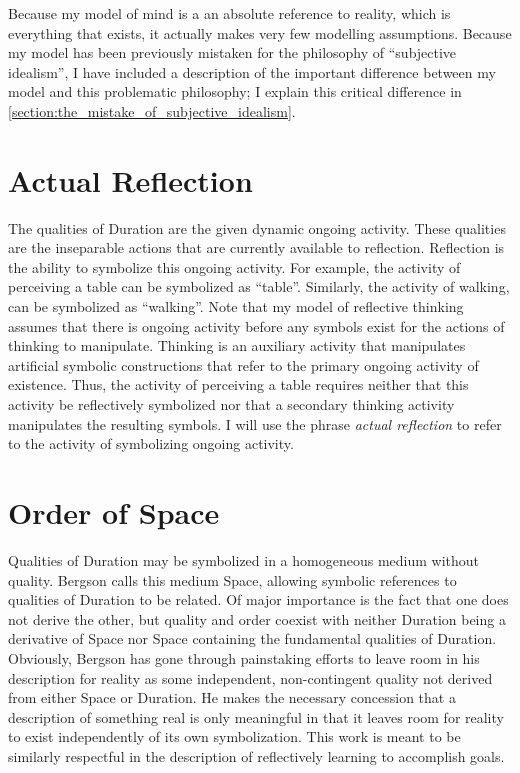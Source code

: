 Because my model of mind is a an absolute reference to reality, which
is everything that exists, it actually makes very few modelling
assumptions.  Because my model has been previously mistaken for the
philosophy of ``subjective idealism'', I have included a description
of the important difference between my model and this problematic
philosophy; I explain this critical difference in
\autoref{section:the_mistake_of_subjective_idealism}.

\section{Actual Reflection}

The qualities of Duration are the given dynamic ongoing activity.
These qualities are the inseparable actions that are currently
available to reflection.  Reflection is the ability to symbolize this
ongoing activity.  For example, the activity of perceiving a table can
be symbolized as ``table''.  Similarly, the activity of walking, can
be symbolized as ``walking''.  Note that my model of reflective
thinking assumes that there is ongoing activity before any symbols
exist for the actions of thinking to manipulate.  Thinking is an
auxiliary activity that manipulates artificial symbolic constructions
that refer to the primary ongoing activity of existence.  Thus, the
activity of perceiving a table requires neither that this activity be
reflectively symbolized nor that a secondary thinking activity
manipulates the resulting symbols.  I will use the phrase \emph{actual
  reflection} to refer to the activity of symbolizing ongoing
activity.

\section{Order of Space}

Qualities of Duration may be symbolized in a homogeneous medium
without quality.  Bergson calls this medium Space, allowing symbolic
references to qualities of Duration to be related.  Of major
importance is the fact that one does not derive the other, but quality
and order coexist with neither Duration being a derivative of Space
nor Space containing the fundamental qualities of Duration.
Obviously, Bergson has gone through painstaking efforts to leave room
in his description for reality as some independent, non-contingent
quality not derived from either Space or Duration.  He makes the
necessary concession that a description of something real is only
meaningful in that it leaves room for reality to exist independently
of its own symbolization.  This work is meant to be similarly
respectful in the description of reflectively learning to accomplish
goals.

